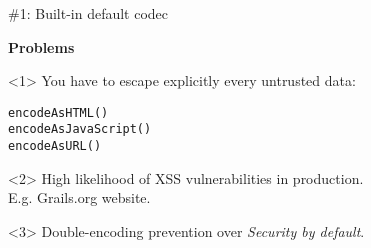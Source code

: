 \begin{frame}

    \vspace{.5cm}

    \begin{center}
      \Huge \#1: Built-in default codec \\
    \end{center}

    \vspace{1cm}

    \Large
    \textbf{Problems} \\[1em]

    \begin{onlyenv}<1>
      You have to escape explicitly every untrusted data:
      \begin{center}
        \begin{minipage}{.9\textwidth}
          \begin{verbatim}
encodeAsHTML()
encodeAsJavaScript()
encodeAsURL()
          \end{verbatim}
        \end{minipage}
      \end{center}
    \end{onlyenv}

    \begin{onlyenv}<2>
      High likelihood of XSS vulnerabilities in production.\\[1em]
      E.g. Grails.org website.
    \end{onlyenv}

    \begin{onlyenv}<3>
      Double-encoding prevention over \emph{Security by default}.
    \end{onlyenv}

    \vfill

\end{frame}

